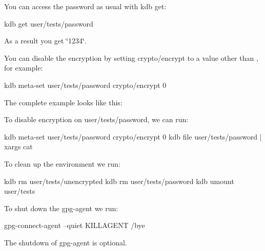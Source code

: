 You can access the password as usual with {\ttfamily kdb get}\+:


\begin{DoxyCode}
kdb get user/tests/password
\end{DoxyCode}


As a result you get \char`\"{}1234\char`\"{}.

You can disable the encryption by setting {\ttfamily crypto/encrypt} to a value other than {}, for example\+:


\begin{DoxyCode}
kdb meta-set user/tests/password crypto/encrypt 0
\end{DoxyCode}


The complete example looks like this\+:




To disable encryption on {\ttfamily user/tests/password}, we can run\+:


\begin{DoxyCode}
kdb meta-set user/tests/password crypto/encrypt 0
kdb file user/tests/password | xargs cat
\end{DoxyCode}


To clean up the environment we run\+:


\begin{DoxyCode}
kdb rm user/tests/unencrypted
kdb rm user/tests/password
kdb umount user/tests
\end{DoxyCode}


To shut down the {\ttfamily gpg-\/agent} we run\+:


\begin{DoxyCode}
gpg-connect-agent --quiet KILLAGENT /bye
\end{DoxyCode}


The shutdown of {\ttfamily gpg-\/agent} is optional. 